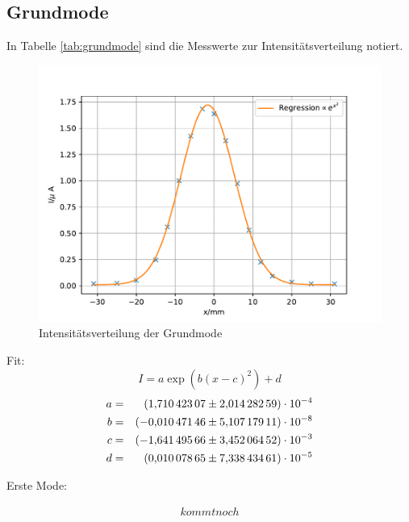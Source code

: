 \subsection{Grundmode}
In Tabelle \ref{tab:grundmode} sind die Messwerte zur Intensitätsverteilung notiert.


\begin{figure}
  \centering
  \includegraphics[width=\textwidth]{grundmode.pdf}
  \caption{Intensitätsverteilung der Grundmode}
  \label{fig:grundmode}
\end{figure}
Fit:
\begin{equation*}
  I= a \exp{\left( b(x-c)^2 \right)}+d
\end{equation*}
\begin{align*}
a &=& \SI{ 1.71042307 \pm 2.01428259e-04}{}\\
b &=& \SI{-0.01047146 \pm 5.10717911e-08}{}\\
c &=& \SI{-1.64149566 \pm 3.45206452e-03}{}\\
d &=& \SI{ 0.01007865 \pm 7.33843461e-05}{}\\
\end{align*}
\FloatBarrier

Erste Mode:

\begin{align*}
kommt noch\\
\end{align*}
\FloatBarrier
